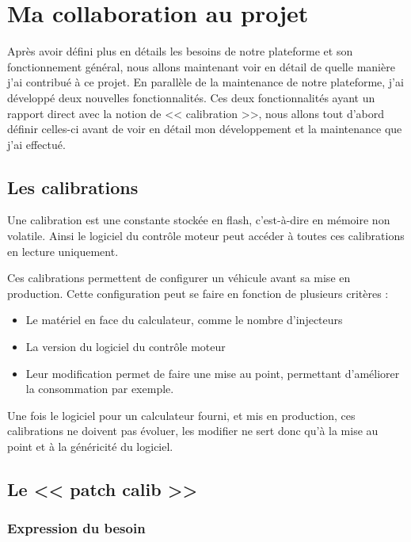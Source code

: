 \chapter{Ma collaboration au projet}\label{collab}
\putminitoc
Après avoir défini plus en détails les besoins de notre plateforme et son fonctionnement général, nous allons maintenant voir en détail de quelle manière j'ai contribué à ce projet. En parallèle de la maintenance de notre plateforme, j'ai développé deux nouvelles fonctionnalités. Ces deux fonctionnalités ayant un rapport direct avec la notion de << calibration >>, nous allons tout d'abord définir celles-ci avant de voir en détail mon développement et la maintenance que j'ai effectué.

\section{Les calibrations}
Une calibration est une constante stockée en flash, c'est-à-dire en mémoire non volatile. Ainsi le logiciel du contrôle moteur peut accéder à toutes ces calibrations en lecture uniquement.

Ces calibrations permettent de configurer un véhicule avant sa mise en production. Cette configuration peut se faire en fonction de plusieurs critères : 
\begin{itemize}
	\item Le matériel en face du calculateur, comme le nombre d'injecteurs
	\item La version du logiciel du contrôle moteur
	\item Leur modification permet de faire une mise au point, permettant d'améliorer la consommation par exemple.
\end{itemize}

Une fois le logiciel pour un calculateur fourni, et mis en production, ces calibrations ne doivent pas évoluer, les modifier ne sert donc qu'à la mise au point et à la généricité du logiciel.
\section{Le << patch calib >>}\label{patch}
	\subsection{Expression du besoin}\label{besoin-patch}
